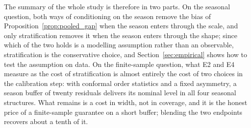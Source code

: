 The summary of the whole study is therefore in two parts.  On the
seasonal question, both ways of conditioning on the season remove the
bias of Proposition~\ref{prop:pooled_gap} when the season enters through
the scale, and only stratification removes it when the season enters
through the shape; since which of the two holds is a modelling
assumption rather than an observable, stratification is the conservative
choice, and Section~\ref{sec:empirical} shows how to test the assumption
on data.  On the finite-sample question, what E2 and E4 measure as the
cost of stratification is almost entirely the cost of two choices in the
calibration step: with conformal order statistics and a fixed asymmetry,
a season buffer of twenty residuals delivers its nominal level in all
four seasonal structures.  What remains is a cost in width, not in
coverage, and it is the honest price of a finite-sample guarantee on a
short buffer; blending the two endpoints recovers about a tenth of it.
